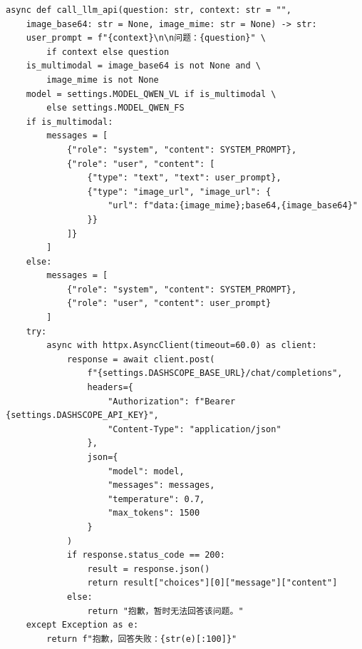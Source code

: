 \documentclass[a4paper,10pt]{article}
\begin{document}
\begin{lstlisting}
async def call_llm_api(question: str, context: str = "",
    image_base64: str = None, image_mime: str = None) -> str:
    user_prompt = f"{context}\n\n问题：{question}" \
        if context else question
    is_multimodal = image_base64 is not None and \
        image_mime is not None
    model = settings.MODEL_QWEN_VL if is_multimodal \
        else settings.MODEL_QWEN_FS
    if is_multimodal:
        messages = [
            {"role": "system", "content": SYSTEM_PROMPT},
            {"role": "user", "content": [
                {"type": "text", "text": user_prompt},
                {"type": "image_url", "image_url": {
                    "url": f"data:{image_mime};base64,{image_base64}"
                }}
            ]}
        ]
    else:
        messages = [
            {"role": "system", "content": SYSTEM_PROMPT},
            {"role": "user", "content": user_prompt}
        ]
    try:
        async with httpx.AsyncClient(timeout=60.0) as client:
            response = await client.post(
                f"{settings.DASHSCOPE_BASE_URL}/chat/completions",
                headers={
                    "Authorization": f"Bearer {settings.DASHSCOPE_API_KEY}",
                    "Content-Type": "application/json"
                },
                json={
                    "model": model,
                    "messages": messages,
                    "temperature": 0.7,
                    "max_tokens": 1500
                }
            )
            if response.status_code == 200:
                result = response.json()
                return result["choices"][0]["message"]["content"]
            else:
                return "抱歉，暂时无法回答该问题。"
    except Exception as e:
        return f"抱歉，回答失败：{str(e)[:100]}"


\end{lstlisting}
\end{document}
